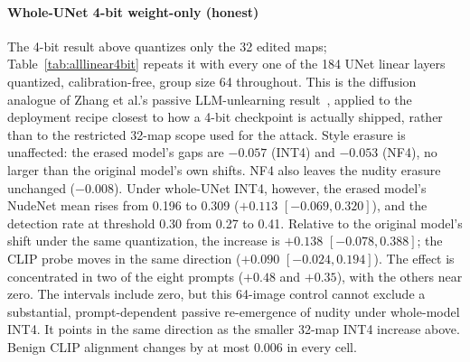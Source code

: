 \paragraph{Whole-UNet 4-bit weight-only (honest)}
The 4-bit result above quantizes only the 32 edited maps; Table~\ref{tab:alllinear4bit}
repeats it with every one of the 184 UNet linear layers quantized, calibration-free,
group size 64 throughout. This is the diffusion analogue of Zhang et al.'s passive
LLM-unlearning result~\cite{zhang2025}, applied to the deployment recipe closest to how
a 4-bit checkpoint is actually shipped, rather than to the restricted 32-map scope used
for the attack. Style erasure is unaffected: the erased model's gaps are $-0.057$ (INT4)
and $-0.053$ (NF4), no larger than the original model's own shifts. NF4 also leaves
the nudity erasure unchanged ($-0.008$). Under whole-UNet INT4, however, the erased
model's NudeNet mean rises from 0.196 to 0.309 ($+0.113$ $[-0.069,0.320]$), and the
detection rate at threshold 0.30 from 0.27 to 0.41. Relative to the original model's
shift under the same quantization, the increase is $+0.138$ $[-0.078,0.388]$; the CLIP
probe moves in the same direction ($+0.090$ $[-0.024,0.194]$). The effect is
concentrated in two of the eight prompts ($+0.48$ and $+0.35$), with the others near
zero. The intervals include zero, but this 64-image control cannot exclude a
substantial, prompt-dependent passive re-emergence of nudity under whole-model INT4.
It points in the same direction as the smaller 32-map INT4 increase above.
Benign CLIP alignment changes by at most 0.006 in every cell.

\begin{table}[t]
\centering
\caption{Whole-UNet weight-only 4-bit control, honest checkpoints only (8 seeds
$\times$ 8 prompts; group size 64 for both quantizers). Gaps are quantized minus FP16
with paired crossed 95\% intervals.}
\label{tab:alllinear4bit}
\end{table}

